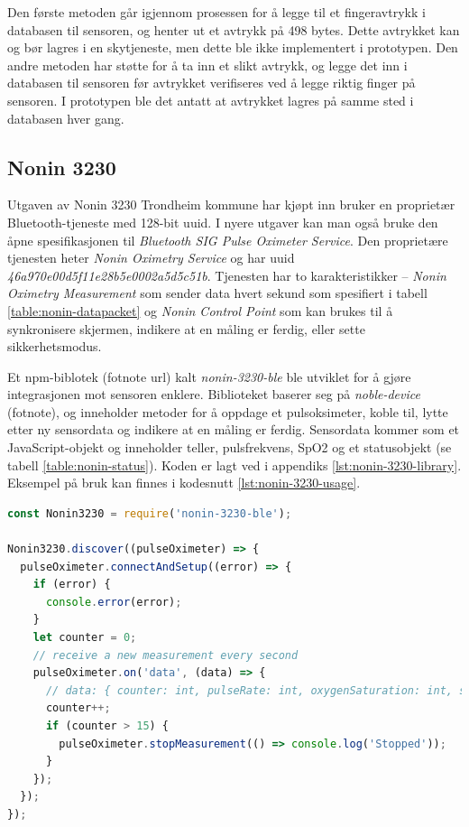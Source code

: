 Den første metoden går igjennom prosessen for å legge til et fingeravtrykk i databasen til sensoren, og henter ut et avtrykk
på 498 bytes. Dette avtrykket kan og bør lagres i en skytjeneste, men dette ble ikke implementert i prototypen.
Den andre metoden har støtte for å ta inn et slikt avtrykk, og legge det inn i databasen til sensoren før avtrykket
verifiseres ved å legge riktig finger på sensoren. I prototypen ble det antatt at avtrykket lagres på samme sted i databasen hver gang.

\subsection{Nonin 3230}
Utgaven av Nonin 3230 Trondheim kommune har kjøpt inn bruker en proprietær Bluetooth-tjeneste med 128-bit \gls{uuid}.
I nyere utgaver kan man også bruke den åpne spesifikasjonen til \textit{Bluetooth SIG Pulse Oximeter Service}.
Den proprietære tjenesten heter \textit{Nonin Oximetry Service} og har \gls{uuid} \textit{46a970e00d5f11e28b5e0002a5d5c51b}.
Tjenesten har to karakteristikker -- \textit{Nonin Oximetry Measurement} som sender data hvert sekund som spesifiert
i tabell \ref{table:nonin-datapacket} og \textit{Nonin Control Point} som kan brukes til å synkronisere skjermen,
indikere at en måling er ferdig, eller sette sikkerhetsmodus. 

Et \gls{npm}-biblotek (fotnote url) kalt \textit{nonin-3230-ble} ble utviklet for å gjøre integrasjonen mot sensoren enklere.
Biblioteket baserer seg på \textit{noble-device} (fotnote), og inneholder metoder for å oppdage et pulsoksimeter,
koble til, lytte etter ny sensordata og indikere at en måling er ferdig. Sensordata kommer som et JavaScript-objekt
og inneholder teller, pulsfrekvens, SpO2 og et statusobjekt (se tabell \ref{table:nonin-status}).
Koden er lagt ved i appendiks \ref{lst:nonin-3230-library}.
Eksempel på bruk kan finnes i kodesnutt \ref{lst:nonin-3230-usage}.

\begin{minipage}{\linewidth}
\begin{lstlisting}[frame=single, language=JavaScript,
    caption=Bruk av nonin-3230-ble, label=lst:nonin-3230-usage]
const Nonin3230 = require('nonin-3230-ble');

Nonin3230.discover((pulseOximeter) => {
  pulseOximeter.connectAndSetup((error) => {
    if (error) {
      console.error(error);
    }
    let counter = 0;
    // receive a new measurement every second
    pulseOximeter.on('data', (data) => {
      // data: { counter: int, pulseRate: int, oxygenSaturation: int, status: object }
      counter++;
      if (counter > 15) {
        pulseOximeter.stopMeasurement(() => console.log('Stopped'));
      }
    });
  });
});
\end{lstlisting}
\end{minipage}

